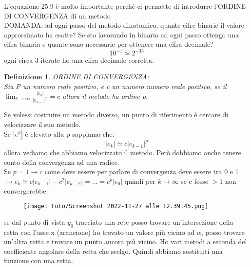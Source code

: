 \documentclass[a4paper, portrait]{book}
\numberwithin{equation}{chapter} %
\newtheorem{definition}{Definizione}
\begin{document}
L'equazione 25.9 è molto importante perché ci permette di introdurre l'ORDINE DI CONVERGENZA di un metodo\\
DOMANDA: ad ogni passo del metodo dinotomico, quante cifre binarie il valore approssimato ha esatte? Se sto lavorando in binario ad ogni passo ottengo una cifra binaria e quante sono necessarie per ottenere una cifra decimale?
\begin{equation}
    10^{-1} \simeq 2^{-33}
\end{equation}
ogni circa 3 iterate ho una cifra decimale corretta.
\begin{definition}
    ORDINE DI CONVERGENZA:\\
    Sia P un numero reale positivo, e c un numero numero reale positivo, se il $\lim_{k\rightarrow \infty}\frac{|e_k|}{|e_{k-1}|^p} = c$ allora il metodo ha ordine p.\\
\end{definition}
Se volessi costruire un metodo diverso, un punto di riferimento è cercare di velocizzare il suo metodo.\\
Se $|e^k|$ è elevato alla p sappiamo che:
\begin{equation}
    |e_k| \simeq c|e_{k-1}|^p
\end{equation}
allora vediamo che abbiamo velocizzato il metodo. Però dobbiamo anche tenere conto della convergenza ad una radice.\\
Se $p = 1 \rightarrow c$ come deve essere per parlare di convergenza deve essere tra 0 e 1 $\rightarrow e_k \simeq c|e_{k-1}|- c^2 |e_{k-2}| = ... = c^k |e_0|$ quindi per $k \rightarrow \infty$ se c fosse $>1$ non convergerebbe.
\begin{figure}[h!]
    \centering
    \texttt{[image: Foto/Screenshot 2022-11-27 alle 12.39.45.png]}
    \caption{}
\end{figure}
se dal punto di vista $y_0$ tracciato una rete posso trovare un'intersezione della retta con l'asse x (arancione) ho trovato un valore più vicino ad $\alpha$, posso trovare un'altra retta e trovare un punto ancora più vicino. Ho vari metodi a seconda del coefficiente angolare della retta che scelgo. Quindi abbiamo sostituiti una funzione con una retta.
\end{document}

